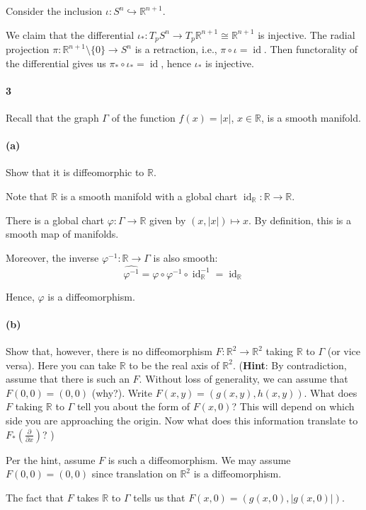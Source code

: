 \documentclass[12pt]{article}
\newlength{\myparskip}
\newenvironment{fullbox}{\begin{lrbox}{\savefullbox}\begin{minipage}{\dimexpr\textwidth-2\fboxsep\relax}\setlength{\parskip}{\myparskip}}{\end{minipage}\end{lrbox}\framebox[\textwidth]{\usebox{\savefullbox}}}
\newenvironment{pbox}[1][]{\begin{fullbox}\def\temp{#1}\ifx\temp\empty\else\paragraph{#1}\phantom{}\fi}{\end{fullbox}}
\theoremstyle{definition}
\newcommand{\R}{\mathbb{R}}
\renewcommand{\phi}{\varphi}
\newcommand{\<}{\langle}
\renewcommand{\>}{\rangle}
\newcommand{\iso}{\cong}
\DeclareMathOperator{\id}{id}
\newcommand{\inc}{\hookrightarrow}
\begin{document}
Consider the inclusion $\iota : S^n \inc \R^{n+1}$.

We claim that the differential $\iota_* : T_pS^n \to T_p\R^{n+1} \iso \R^{n+1}$ is injective.
The radial projection $\pi : \R^{n+1} \setminus \{0\} \to S^n$ is a retraction, i.e., $\pi \circ \iota = \id$.
Then functorality of the differential gives us $\pi_* \circ \iota_* = \id$, hence $\iota_*$ is injective.




\newpage
\begin{pbox}[3]
    Recall that the graph $\Gamma$ of the function $f(x) = |x|$, $x\in \R$, is a smooth manifold.
\end{pbox}

\begin{pbox}[(a)]
    Show that it is diffeomorphic to $\R$.
\end{pbox}

Note that $\R$ is a smooth manifold with a global chart $\id_\R : \R \to \R$.

There is a global chart $\phi : \Gamma \to \R$ given by $(x, |x|) \mapsto x$.
By definition, this is a smooth map of manifolds.

Moreover, the inverse $\phi^{-1} : \R \to \Gamma$ is also smooth:
\[
    \widehat{\phi^{-1}}
        = \phi \circ \phi^{-1} \circ \id_\R^{-1}
        = \id_\R
\]

Hence, $\phi$ is a diffeomorphism.

\begin{pbox}[(b)]
    Show that, however, there is no diffeomorphism $F: \R^2\to \R^2$ taking $\R$ to $\Gamma$ (or vice versa). Here you can take $\R$ to be the real axis of $\R^2$. (\textbf{Hint}: By contradiction, assume that there is such an $F$. Without loss of generality, we can assume that $F(0,0) = (0,0)$ (why?). Write $F(x,y) = (g(x,y), h(x,y))$. What does $F$ taking $\R$ to $\Gamma$ tell you about the form of $F(x,0)$? This will depend on which side you are approaching the origin. Now what does this information translate to $F_*(\frac{\partial}{\partial x})$? )
\end{pbox}

Per the hint, assume $F$ is such a diffeomorphism.
We may assume $F(0, 0) = (0, 0)$ since translation on $\R^2$ is a diffeomorphism.

The fact that $F$ takes $\R$ to $\Gamma$ tells us that $F(x, 0) = (g(x, 0), |g(x, 0)|)$.
\end{document}
